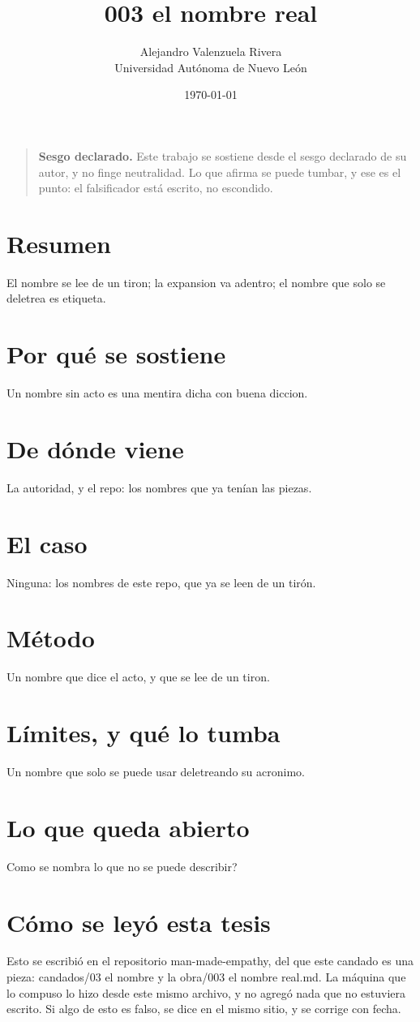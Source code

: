 \documentclass[11pt,a4paper]{article}
\title{003 el nombre real}
\author{Alejandro Valenzuela Rivera\\\small Universidad Autónoma de Nuevo León}
\date{\today}
\begin{document}
\maketitle

\begin{quote}
\textbf{Sesgo declarado.} Este trabajo se sostiene desde el sesgo declarado de su autor, y no finge neutralidad. Lo que afirma se puede tumbar, y ese es el punto: el falsificador está escrito, no escondido.
\end{quote}

\section*{Resumen}
El nombre se lee de un tiron; la expansion va adentro; el nombre que solo se deletrea es etiqueta.

\section{Por qué se sostiene}
Un nombre sin acto es una mentira dicha con buena diccion.

\section{De dónde viene}
La autoridad, y el repo: los nombres que ya tenían las piezas.

\section{El caso}
Ninguna: los nombres de este repo, que ya se leen de un tirón.

\section{Método}
Un nombre que dice el acto, y que se lee de un tiron.

\section{Límites, y qué lo tumba}
Un nombre que solo se puede usar deletreando su acronimo.

\section{Lo que queda abierto}
\textquestiondown{}Como se nombra lo que no se puede describir?

\section*{Cómo se leyó esta tesis}
Esto se escribió en el repositorio man-made-empathy, del que este candado es una pieza: candados/03 el nombre y la obra/003 el nombre real.md. La máquina que lo compuso lo hizo desde este mismo archivo, y no agregó nada que no estuviera escrito. Si algo de esto es falso, se dice en el mismo sitio, y se corrige con fecha.
\end{document}
